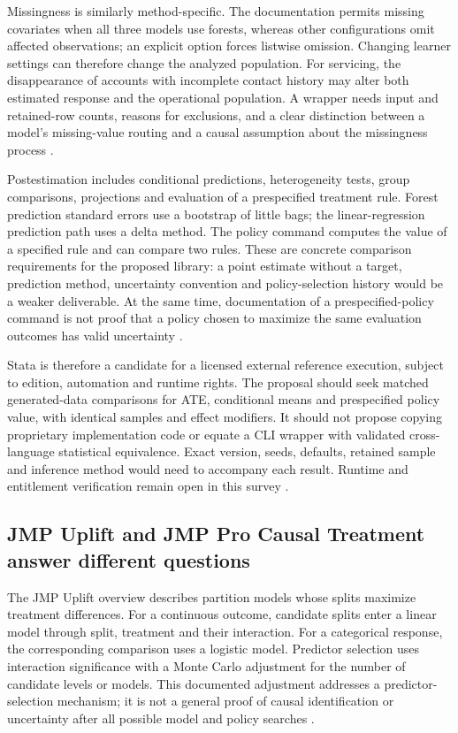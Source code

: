 Missingness is similarly method-specific. The documentation permits missing
covariates when all three models use forests, whereas other configurations
omit affected observations; an explicit option forces listwise omission.
Changing learner settings can therefore change the analyzed population.
For servicing, the disappearance of accounts with incomplete contact history
may alter both estimated response and the operational population. A wrapper
needs input and retained-row counts, reasons for exclusions, and a clear
distinction between a model's missing-value routing and a causal assumption
about the missingness process \cite{exec13_ch_stata}.

Postestimation includes conditional predictions, heterogeneity tests, group
comparisons, projections and evaluation of a prespecified treatment rule.
Forest prediction standard errors use a bootstrap of little bags; the
linear-regression prediction path uses a delta method. The policy command
computes the value of a specified rule and can compare two rules. These
are concrete comparison requirements for the proposed library: a point
estimate without a target, prediction method, uncertainty convention and
policy-selection history would be a weaker deliverable. At the same time,
documentation of a prespecified-policy command is not proof that a policy
chosen to maximize the same evaluation outcomes has valid uncertainty
\cite{exec13_ch_stata}.

Stata is therefore a candidate for a licensed external reference execution,
subject to edition, automation and runtime rights. The proposal should seek
matched generated-data comparisons for ATE, conditional means and
prespecified policy value, with identical samples and effect modifiers.
It should not propose copying proprietary implementation code or equate
a CLI wrapper with validated cross-language statistical equivalence.
Exact version, seeds, defaults, retained sample and inference method would
need to accompany each result. Runtime and entitlement verification remain
open in this survey \cite{exec13_ch_scope}.

\subsection{JMP Uplift and JMP Pro Causal Treatment answer different questions}

The JMP Uplift overview describes partition models whose splits maximize
treatment differences. For a continuous outcome, candidate splits enter a
linear model through split, treatment and their interaction. For a
categorical response, the corresponding comparison uses a logistic model.
Predictor selection uses interaction significance with a Monte Carlo
adjustment for the number of candidate levels or models. This documented
adjustment addresses a predictor-selection mechanism; it is not a general
proof of causal identification or uncertainty after all possible model and
policy searches \cite{exec13_ch_jmp_uplift}.

